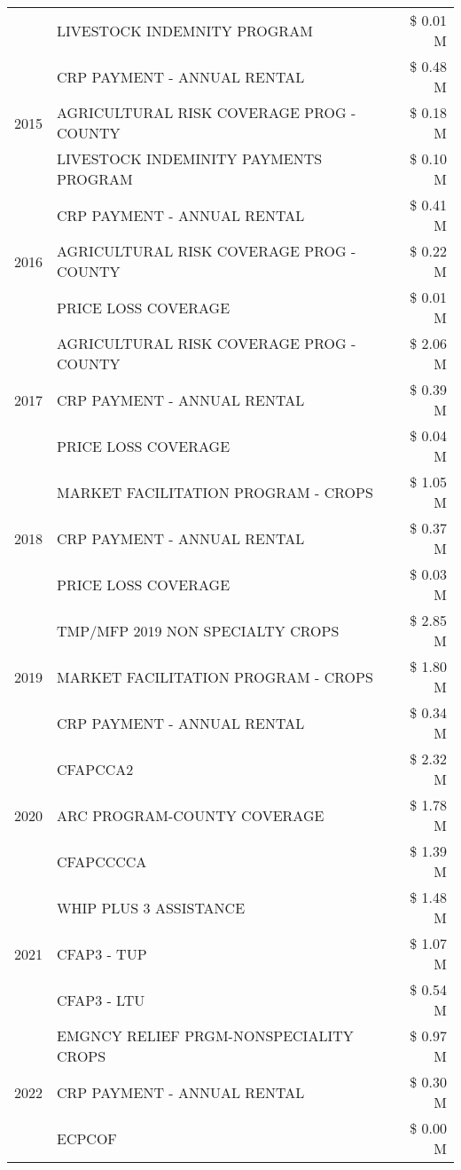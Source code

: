 \begin{tabular}{llr}
 & LIVESTOCK INDEMNITY PROGRAM & \$ 0.01 M \\
\cline{1-3}
\multirow[t]{3}{*}{2015} & CRP PAYMENT - ANNUAL RENTAL & \$ 0.48 M \\
 & AGRICULTURAL RISK COVERAGE PROG - COUNTY & \$ 0.18 M \\
 & LIVESTOCK INDEMINITY PAYMENTS PROGRAM & \$ 0.10 M \\
\cline{1-3}
\multirow[t]{3}{*}{2016} & CRP PAYMENT - ANNUAL RENTAL & \$ 0.41 M \\
 & AGRICULTURAL RISK COVERAGE PROG - COUNTY & \$ 0.22 M \\
 & PRICE LOSS COVERAGE & \$ 0.01 M \\
\cline{1-3}
\multirow[t]{3}{*}{2017} & AGRICULTURAL RISK COVERAGE PROG - COUNTY & \$ 2.06 M \\
 & CRP PAYMENT - ANNUAL RENTAL & \$ 0.39 M \\
 & PRICE LOSS COVERAGE & \$ 0.04 M \\
\cline{1-3}
\multirow[t]{3}{*}{2018} & MARKET FACILITATION PROGRAM - CROPS & \$ 1.05 M \\
 & CRP PAYMENT - ANNUAL RENTAL & \$ 0.37 M \\
 & PRICE LOSS COVERAGE & \$ 0.03 M \\
\cline{1-3}
\multirow[t]{3}{*}{2019} & TMP/MFP 2019 NON SPECIALTY CROPS & \$ 2.85 M \\
 & MARKET FACILITATION PROGRAM - CROPS & \$ 1.80 M \\
 & CRP PAYMENT - ANNUAL RENTAL & \$ 0.34 M \\
\cline{1-3}
\multirow[t]{3}{*}{2020} & CFAPCCA2 & \$ 2.32 M \\
 & ARC PROGRAM-COUNTY COVERAGE & \$ 1.78 M \\
 & CFAPCCCCA & \$ 1.39 M \\
\cline{1-3}
\multirow[t]{3}{*}{2021} & WHIP PLUS 3 ASSISTANCE & \$ 1.48 M \\
 & CFAP3 - TUP & \$ 1.07 M \\
 & CFAP3 - LTU & \$ 0.54 M \\
\cline{1-3}
\multirow[t]{3}{*}{2022} & EMGNCY RELIEF PRGM-NONSPECIALITY CROPS & \$ 0.97 M \\
 & CRP PAYMENT - ANNUAL RENTAL & \$ 0.30 M \\
 & ECPCOF & \$ 0.00 M \\
\cline{1-3}
\bottomrule
\end{tabular}
